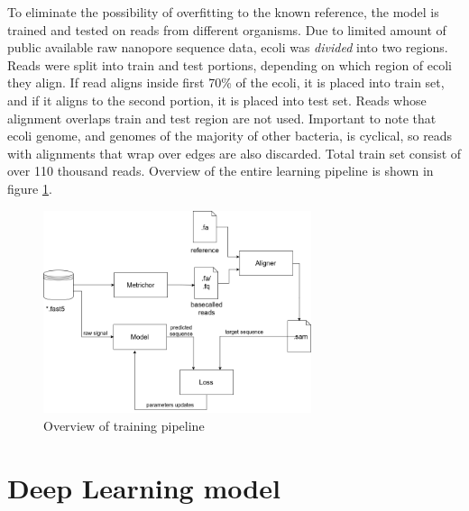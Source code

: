 \documentclass[times, utf8, diplomski, numeric, english]{fer}
\begin{document}
To eliminate the possibility of overfitting to the known reference, the model is trained and tested on reads from different organisms. Due to limited amount of public available raw nanopore sequence data, ecoli was \textit{divided} into two regions.
Reads were split into train and test portions, depending on which region of ecoli they align. 
If read aligns inside first 70\% of the ecoli, it is placed into train set, and if it aligns to the second portion, it is placed into test set. Reads whose alignment overlaps train and test region are not used. Important to note that ecoli genome, and genomes of the majority of other bacteria, is cyclical, so reads with alignments that wrap over edges are also discarded. Total train set consist of over 110 thousand reads.
Overview of the entire learning pipeline is shown in figure \ref{fg:train_pipe}.
\begin{figure}[!ht]
	\begin{center}
		\includegraphics[width=0.7\textwidth]{./imgs/train_pipeline.png}
		\caption{Overview of training pipeline}
		\label{fg:train_pipe}
	\end{center}
\end{figure}

\section{Deep Learning model}
\end{document}
